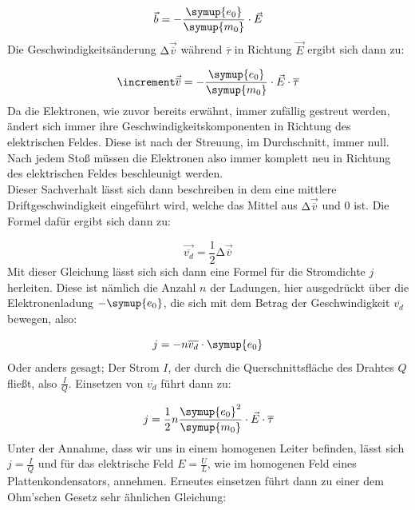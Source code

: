 \begin{equation}
  \vec{b} = -\frac{\symup{e_0}}{\symup{m_0}} \cdot \vec{E} \nonumber
\end{equation}
\noindent
Die Geschwindigkeitsänderung $\increment\vec{\overline{v}}$ während $\overline{\tau}$ in Richtung $\vec{E}$ ergibt sich dann zu:

\begin{equation}
  \increment\vec{\overline{v}}= -\frac{\symup{e_0}}{\symup{m_0}}\cdot \vec{E} \cdot \overline{\tau} \nonumber
\end{equation}
\noindent
Da die Elektronen, wie zuvor bereits erwähnt, immer zufällig gestreut werden, ändert sich immer ihre Geschwindigkeitskomponenten in Richtung
des elektrischen Feldes. Diese ist nach der Streuung, im Durchschnitt, immer null.
Nach jedem Stoß müssen die Elektronen also immer komplett neu in Richtung des elektrischen Feldes beschleunigt werden.\\
Dieser Sachverhalt lässt sich dann beschreiben in dem eine mittlere Driftgeschwindigkeit eingeführt wird, welche das Mittel aus $\increment\vec{\overline{v}}$ 
und 0 ist. Die Formel dafür ergibt sich dann zu:

\begin{equation}
  \vec{\overline{v_d}}=\frac{1}{2}\increment\vec{\overline{v}} \nonumber
\end{equation}
\noindent
Mit dieser Gleichung lässt sich sich dann eine Formel für die Stromdichte $j$ herleiten. Diese ist nämlich die Anzahl $n$ der Ladungen, hier ausgedrückt
über die Elektronenladung $-\symup{e_0}$, die sich mit dem Betrag der Geschwindigkeit $\overline{v_d}$ bewegen, also:

\begin{equation}
  j=-n\overline{v_d}\cdot \symup{e_0} 
  \label{eqn:j1}
\end{equation}
\noindent
Oder anders gesagt; Der Strom $I$, der durch die Querschnittsfläche des Drahtes $Q$ fließt, also $\frac{I}{Q}$.
Einsetzen von $\overline{v_d}$  führt dann zu:

\begin{equation}
  j=\frac{1}{2}n\frac{\symup{e_0}^2}{\symup{m_0}}\cdot \vec{E} \cdot \overline{\tau} \nonumber
\end{equation}
\noindent
Unter der Annahme, dass wir uns in einem homogenen Leiter befinden, lässt sich $j=\frac{I}{Q}$ und für das elektrische Feld $E=\frac{U}{L}$, wie im homogenen Feld eines Plattenkondensators, annehmen.
Erneutes einsetzen führt dann zu einer dem Ohm'schen Gesetz sehr ähnlichen Gleichung:

